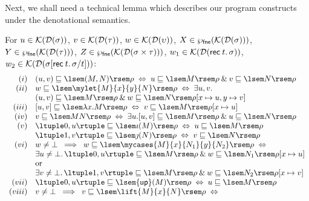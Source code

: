 Next, we shall need a technical lemma which  describes our program constructs under the denotational semantics.
\begin{lemma}
\label{techlem}
For $u \in {\cal K}({\cal D}(\sigma ))$, $v \in {\cal K}({\cal D}(\tau ))$, $w \in {\cal K}({\cal D}(\upsilon ))$, 
$X \in \wp_{\sf fne}({\cal K}({\cal D}(\sigma )))$, 
$Y \in \wp_{\sf fne}({\cal K}({\cal D}(\tau )))$, 
$Z \in \wp_{\sf fne}({\cal K}({\cal D}(\sigma \times \tau )))$,
$w_{1} \in {\cal K}({\cal D}({\sf rec} \: t. \, \sigma ))$, $w_{2} \in {\cal K}({\cal D}(\sigma [{\sf rec} \: t. \, \sigma /t]))$:
\[ \begin{array}{rl}
(i) & (u, v) \sqsubseteq \lsem (M, N) \rsem \rho \; \Leftrightarrow \; u \sqsubseteq \lsem M \rsem \rho \: \& \: v \sqsubseteq \lsem N \rsem \rho \\
(ii) & w \sqsubseteq \lsem \mylet{M}{x}{y}{N} \rsem \rho \; \Leftrightarrow \; \exists u, v.  \\
& (u, v) \sqsubseteq \lsem M \rsem \rho \: \& \: w \sqsubseteq \lsem N \rsem \rho [x \mapsto u, y \mapsto v] \\
(iii) & [u, v] \sqsubseteq \lsem \lambda x . M \rsem \rho \; \Leftrightarrow \; v \sqsubseteq \lsem M \rsem \rho [x \mapsto u] \\
(iv) & v \sqsubseteq \lsem MN \rsem \rho \;  \Leftrightarrow \; \exists u. [u, v] \sqsubseteq \lsem M \rsem \rho \: \& \: u \sqsubseteq \lsem N \rsem  \rho \\
(v) & \ltuple 0, u \rtuple \sqsubseteq \lsem \imath (M) \rsem \rho \; \Leftrightarrow \; u \sqsubseteq \lsem M \rsem \rho \\
&  \ltuple 1, v \rtuple \sqsubseteq \lsem \jmath (N) \rsem \rho \; \Leftrightarrow \; v \sqsubseteq \lsem N \rsem \rho \\
(vi) & w \not= \bot \;\; \Longrightarrow \;\; w \sqsubseteq \lsem \mycases{M}{x}{N_{1}}{y}{N_{2}} \rsem \rho \; \Leftrightarrow \\
& \exists u \not= \bot . \, \ltuple 0, u \rtuple \sqsubseteq \lsem M \rsem \rho \: \& \: w \sqsubseteq \lsem N_{1} \rsem \rho [x \mapsto u] \\
& \mbox{or} \\
& \exists v \not= \bot . \, \ltuple 1, v \rtuple \sqsubseteq \lsem M \rsem \rho \: \& \: w \sqsubseteq \lsem N_{2} \rsem \rho [x \mapsto v] \\ 
(vii) & \ltuple 0, u \rtuple \sqsubseteq \lsem {\sf up}(M) \rsem \rho \; \Leftrightarrow \; u \sqsubseteq \lsem M \rsem \rho \\
(viii) & v \not= \bot \;\; \Longrightarrow \;\; v \sqsubseteq \lsem \lift{M}{x}{N} \rsem \rho \; \Leftrightarrow \\

\end{array}\]
\end{lemma}
